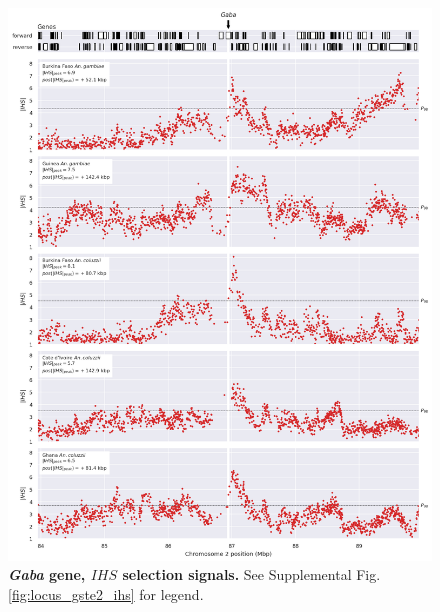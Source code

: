 \documentclass[a4paper,11pt,abstracton,hidelinks]{scrartcl}
\begin{document}
\begin{figure}[t!]
	\begin{center}
		\includegraphics*[width=1\linewidth,center]{artwork/locus_gaba_ihs_pdist.png}
	\end{center}
	\caption[\textit{Gaba} gene, $IHS$ selection signals]{
	\textbf{\textit{Gaba} gene, $IHS$ selection signals.}
	See Supplemental Fig. \ref{fig:locus_gste2_ihs} for legend.
	} 
	\label{fig:locus_gaba_ihs}
\end{figure}


\clearpage
\end{document}

